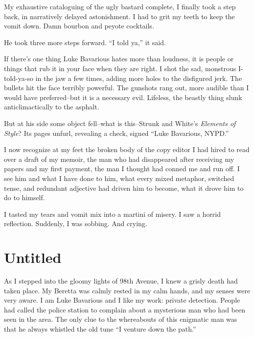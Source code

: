 My exhaustive cataloguing of the ugly bastard complete, I finally
took a step back, in narratively delayed astonishment. I had to
grit my teeth to keep the vomit down. Damn bourbon and peyote
cocktails.



He took three more steps forward. ``I told ya,'' it
said.



If there's one thing Luke Bavarious hates more than loudness,
it is people or things that rub it in your face when they are
right. I shot the sad, monstrous I-told-ya-so in the jaw a few
times, adding more holes to the disfigured jerk. The bullets hit
the face terribly powerful. The gunshots rang out, more audible
than I would have preferred--but it is a necessary evil. Lifeless,
the beastly thing slunk anticlimactically to the asphalt.



But at his side some object fell--what is this--Strunk and
White's {\em Elements of Style}? Its pages unfurl, revealing
a check, signed ``Luke Bavarious, NYPD.''



I now recognize at my feet the broken body of the copy editor I had
hired to read over a draft of my memoir, the man who had
disappeared after receiving my papers and my first payment, the man
I thought had conned me and run off. I see him and what I have done
to him, what every mixed metaphor, switched tense, and redundant
adjective had driven him to become, what it drove him to do to
himself.



I tasted my tears and vomit mix into a martini of misery. I saw a
horrid reflection. Suddenly, I was sobbing. And crying. 

 



\chapter{Untitled}

As I stepped into the gloomy lights of 98th Avenue, I knew a grisly
death had taken place. My Beretta was calmly rested in my calm hands,
and my senses were very aware. I am Luke Bavarious and I like my work:
private detection. People had called the police station to complain
about a mysterious man who had been seen in the area. The only clue to
the whereabouts of this enigmatic man was that he always whistled the
old tune ``I venture down the path.''

